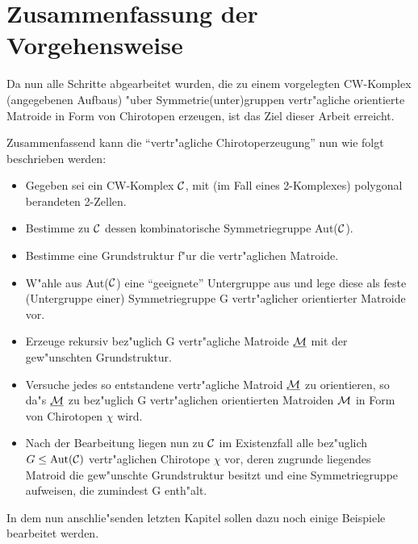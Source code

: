 \clearpage
\section{Zusammenfassung der Vorgehensweise}

Da nun alle Schritte abgearbeitet wurden, die zu einem vorgelegten CW-Komplex
(angegebenen Aufbaus) "uber Symmetrie(unter)gruppen vertr"agliche orientierte
Matroide in Form von Chirotopen erzeugen, ist das Ziel dieser Arbeit erreicht.

Zusammenfassend kann die "`vertr"agliche Chirotoperzeugung"' nun wie folgt
beschrieben werden:

\begin{itemize}
\item Gegeben sei ein CW-Komplex ${\cal C}$, mit (im Fall eines 2-Komplexes)
      polygonal berandeten 2-Zellen.
\item Bestimme zu ${\cal C}$ dessen kombinatorische Symmetriegruppe Aut(${\cal C}$).
\item Bestimme eine Grundstruktur f"ur die vertr"aglichen Matroide.
\item W"ahle aus Aut(${\cal C}$) eine "`geeignete"' Untergruppe aus und lege
      diese als feste (Untergruppe einer) Symmetriegruppe G vertr"aglicher
      orientierter Matroide vor.
\item Erzeuge rekursiv bez"uglich G vertr"agliche Matroide $\underline{\cal M}$
      mit der gew"unschten Grundstruktur.
\item Versuche jedes so entstandene vertr"agliche Matroid $\underline{\cal M}$ zu
      orientieren, so da"s $\underline{\cal M}$ zu bez"uglich G vertr"aglichen
      orientierten Matroiden $\cal M$ in Form von Chirotopen $\chi$ wird.
\item Nach der Bearbeitung liegen nun zu ${\cal C}$ im Existenzfall alle
      bez"uglich $G\leq \mbox{Aut}({\cal C})$ vertr"aglichen Chirotope $\chi$ vor,
      deren zugrunde liegendes Matroid die gew"unschte Grundstruktur besitzt
      und eine Symmetriegruppe aufweisen, die zumindest G enth"alt.
\end{itemize}

In dem nun anschlie"senden letzten Kapitel sollen dazu noch einige Beispiele
bearbeitet werden.
